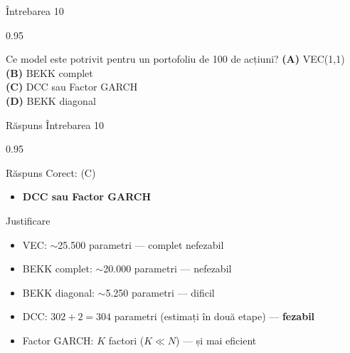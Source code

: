 \documentclass[9pt, aspectratio=169, t]{beamer}
\begin{document}
\begin{frame}{Întrebarea 10}
    \begin{cminipage}{0.95\textwidth}
    \begin{block}{Ce model este potrivit pentru un portofoliu de 100 de acțiuni?}
        \textcolor{MainBlue}{\textbf{(A)}} VEC(1,1)\\[3pt]
        \textcolor{MainBlue}{\textbf{(B)}} BEKK complet\\[3pt]
        \textcolor{MainBlue}{\textbf{(C)}} DCC sau Factor GARCH\\[3pt]
        \textcolor{MainBlue}{\textbf{(D)}} BEKK diagonal
    \end{block}
    \end{cminipage}
\end{frame}

\begin{frame}{Răspuns Întrebarea 10}
    \begin{cminipage}{0.95\textwidth}
    \begin{exampleblock}{Răspuns Corect: (C)}
        \begin{itemize}\setlength{\itemsep}{0pt}
            \item \textbf{DCC sau Factor GARCH}
        \end{itemize}
    \end{exampleblock}

    \pause
    \begin{block}{Justificare}
        \begin{itemize}\setlength{\itemsep}{0pt}
            \item VEC: $\sim$25.500 parametri --- complet nefezabil
            \item BEKK complet: $\sim$20.000 parametri --- nefezabil
            \item BEKK diagonal: $\sim$5.250 parametri --- dificil
            \item DCC: $302 + 2 = 304$ parametri (estimați în două etape) --- \textbf{fezabil}
            \item Factor GARCH: $K$ factori ($K \ll N$) --- și mai eficient
        \end{itemize}
    \end{block}
    \end{cminipage}
\end{frame}
\end{document}
